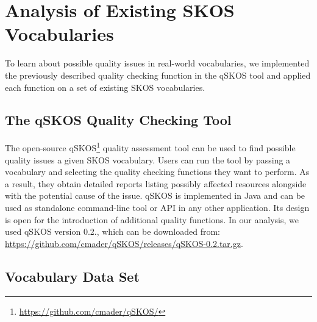
\section{Analysis of Existing SKOS Vocabularies}\label{sec:analysis}

To learn about possible quality issues in real-world vocabularies, we implemented the previously described quality checking function in the qSKOS tool and applied each function on a set of existing SKOS vocabularies. 

\subsection{The qSKOS Quality Checking Tool}

The open-source qSKOS\footnote{\url{https://github.com/cmader/qSKOS/}} quality assessment tool can be used to find possible quality issues a given SKOS vocabulary. Users can run the tool by passing a vocabulary and selecting the quality checking functions they want to perform. As a result, they obtain detailed reports listing possibly affected resources alongside with the potential cause of the issue. qSKOS is implemented in Java and can be used as standalone command-line tool or API in any other application. Its design is open for the introduction of additional quality functions. In our analysis, we used qSKOS version 0.2., which can be downloaded from: \url{https://github.com/cmader/qSKOS/releases/qSKOS-0.2.tar.gz}.


\subsection{Vocabulary Data Set}

